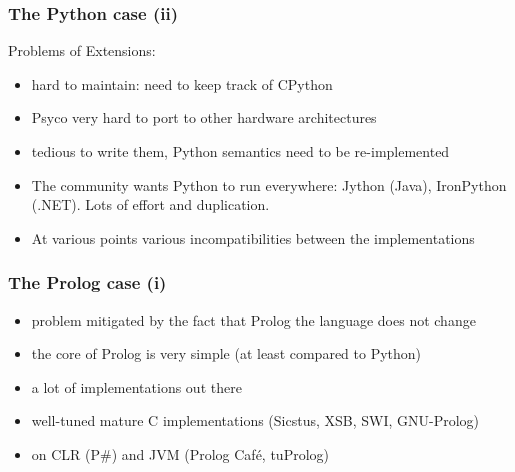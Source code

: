 \documentclass[utf8]{beamer}
\begin{document}
\begin{frame}
  \frametitle{The Python case (ii)}
  \begin{block}{Problems of Extensions:}
    \begin{itemize}
    \item hard to maintain: need to keep track of CPython
    \item Psyco very hard to port to other hardware architectures
    \item tedious to write them, Python semantics need to be re-implemented
    \end{itemize}
  \end{block}
  \begin{itemize}
  \item
    The community wants Python to run everywhere:
    Jython (Java), IronPython (.NET).
    Lots of effort and duplication.

  \item
    At various points various incompatibilities between
    the implementations

  \end{itemize}
\end{frame}


\begin{frame}
  \frametitle{The Prolog case (i)}
  \begin{itemize}
  \item
    problem mitigated by the fact that Prolog the language does not change
  \item
    the core of Prolog is very simple (at least compared to Python)
  \item
    a lot of implementations out there
  \item
    well-tuned mature C implementations (Sicstus, XSB, SWI, GNU-Prolog)
  \item
    on CLR (P\#) and JVM (Prolog Café, tuProlog)
  \end{itemize}
\end{frame}
\end{document}
